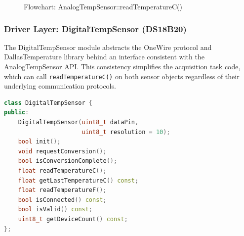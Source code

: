 \begin{figure}[H]
\centering
{}
\caption{Flowchart: AnalogTempSensor::readTemperatureC()}
\label{fig:flowchart_read_temp_analog}
\end{figure}

\subsubsection{Driver Layer: DigitalTempSensor (DS18B20)}

The DigitalTempSensor module abstracts the OneWire protocol and DallasTemperature library behind an interface consistent with the AnalogTempSensor API. This consistency simplifies the acquisition task code, which can call \texttt{readTemperatureC()} on both sensor objects regardless of their underlying communication protocols.

\begin{lstlisting}[language=C++, caption=DigitalTempSensor interface (DigitalTempSensor.h), label=lst:digital_sensor_h]
class DigitalTempSensor {
public:
    DigitalTempSensor(uint8_t dataPin,
                      uint8_t resolution = 10);
    bool init();
    void requestConversion();
    bool isConversionComplete();
    float readTemperatureC();
    float getLastTemperatureC() const;
    float readTemperatureF();
    bool isConnected() const;
    bool isValid() const;
    uint8_t getDeviceCount() const;
};
\end{lstlisting}

